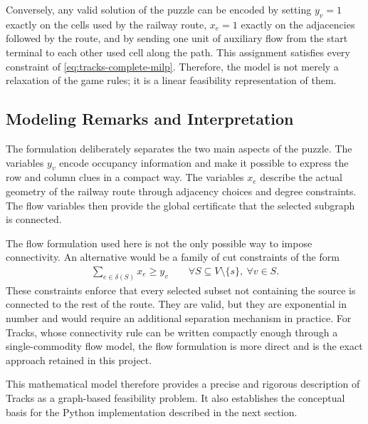 Conversely, any valid solution of the puzzle can be encoded by setting
\(y_v=1\) exactly on the cells used by the railway route, \(x_e=1\) exactly on
the adjacencies followed by the route, and by sending one unit of auxiliary
flow from the start terminal to each other used cell along the path. This
assignment satisfies every constraint of \eqref{eq:tracks-complete-milp}.
Therefore, the model is not merely a relaxation of the game rules; it is a
linear feasibility representation of them.

\subsection{Modeling Remarks and Interpretation}

The formulation deliberately separates the two main aspects of the puzzle. The variables \(y_v\) encode occupancy information and make it possible to express the row and column clues in a compact way. The variables \(x_e\) describe the actual geometry of the railway route through adjacency choices and degree constraints. The flow variables then provide the global certificate that the selected subgraph is connected.

The flow formulation used here is not the only possible way to impose
connectivity. An alternative would be a family of cut constraints of the form
\[
\begin{aligned}
    \sum_{e \in \delta(S)} x_e \geq y_v
    \qquad
    \forall S \subseteq V \setminus \{s\},\ \forall v \in S.
\end{aligned}
\]
These constraints enforce that every selected subset not containing the source
is connected to the rest of the route. They are valid, but they are
exponential in number and would require an additional separation mechanism in
practice. For Tracks, whose connectivity rule can be written compactly enough
through a single-commodity flow model, the flow formulation is more direct and
is the exact approach retained in this project.

This mathematical model therefore provides a precise and rigorous description
of Tracks as a graph-based feasibility problem. It also establishes the
conceptual basis for the Python implementation described in the next section.
